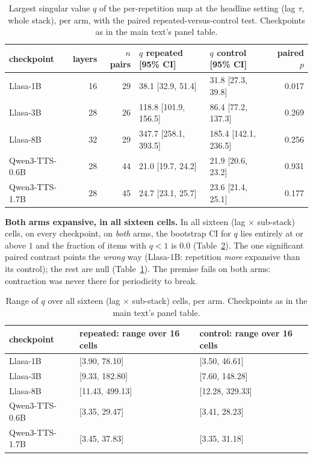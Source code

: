 \begin{table}[htbp]
\centering
\caption{Largest singular value $q$ of the per-repetition map at the
headline setting (lag $\tau$, whole stack), per arm, with the paired
repeated-versus-control test. Checkpoints as in
the main text's panel table.}
\label{tab:qpanel}
\small
\begin{tabular}{@{}lrrp{2.8cm}p{2.8cm}r@{}}
\toprule
checkpoint & layers & $n$ pairs & $q$ repeated [95\% CI] & $q$ control [95\% CI] & paired $p$ \\
\midrule
Llasa-1B & 16 & 29 & 38.1 [32.9, 51.4] & 31.8 [27.3, 39.8] & 0.017 \\
Llasa-3B & 28 & 26 & 118.8 [101.9, 156.5] & 86.4 [77.2, 137.3] & 0.269 \\
Llasa-8B & 32 & 29 & 347.7 [258.1, 393.5] & 185.4 [142.1, 236.5] & 0.256 \\
Qwen3-TTS-0.6B & 28 & 44 & 21.0 [19.7, 24.2] & 21.9 [20.6, 23.2] & 0.931 \\
Qwen3-TTS-1.7B & 28 & 45 & 24.7 [23.1, 25.7] & 23.6 [21.4, 25.1] & 0.177 \\
\bottomrule
\end{tabular}
\end{table}

\noindent\textbf{Both arms expansive, in all sixteen cells.} In all
sixteen (lag $\times$ sub-stack) cells, on every checkpoint, on
\emph{both} arms, the bootstrap CI for $q$ lies entirely at or above
$1$ and the fraction of items with $q < 1$ is $0.0$
(Table~\ref{tab:qcells}). The one significant paired contrast points the \emph{wrong} way
(Llasa-1B: repetition \emph{more} expansive than its control); the rest
are null (Table~\ref{tab:qpanel}). The premise fails on both arms:
contraction was never there for periodicity to break.

\begin{table}[htbp]
\centering
\caption{Range of $q$ over all sixteen (lag $\times$ sub-stack) cells,
per arm. Checkpoints as in the main text's panel table.}
\label{tab:qcells}
\small
\begin{tabular}{@{}lp{3.6cm}p{3.6cm}@{}}
\toprule
checkpoint & repeated: range over 16 cells & control: range over 16 cells \\
\midrule
Llasa-1B & [3.90, 78.10] & [3.50, 46.61] \\
Llasa-3B & [9.33, 182.80] & [7.60, 148.28] \\
Llasa-8B & [11.43, 499.13] & [12.28, 329.33] \\
Qwen3-TTS-0.6B & [3.35, 29.47] & [3.41, 28.23] \\
Qwen3-TTS-1.7B & [3.45, 37.83] & [3.35, 31.18] \\
\bottomrule
\end{tabular}
\end{table}


